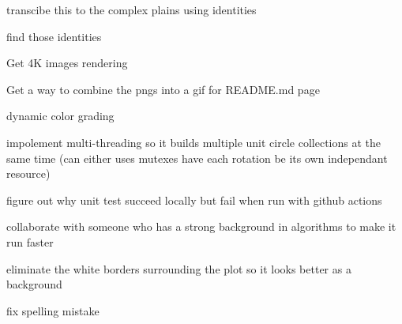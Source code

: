 
\begin{DoxyRefList}
\item[Class \mbox{\hyperlink{classEulersSpiral_1_1EulersSpiral}{Eulers\+Spiral.Eulers\+Spiral}} ]\label{todo__todo000001}%
%
transcibe this to the complex plains using identities 

find those identities  
\item[Namespace \mbox{\hyperlink{namespaceJulia}{Julia}} ]\label{todo__todo000002}%
%
Get 4K images rendering 

Get a way to combine the pngs into a gif for R\+E\+A\+D\+M\+E.\+md page 

dynamic color grading 

impolement multi-\/threading so it builds multiple unit circle collections at the same time (can either uses mutexes have each rotation be its own independant resource) 

figure out why unit test succeed locally but fail when run with github actions 

collaborate with someone who has a strong background in algorithms to make it run faster 

eliminate the white borders surrounding the plot so it looks better as a background  
\item[Member \mbox{\hyperlink{classJulia_1_1Julia_a966f5090e8ab789ab45b8bbe84435da9}{Julia.Julia.color\+\_\+map\+\_\+\+P\+IL}} (self, itterations\+\_\+til\+\_\+divergence)]\label{todo__todo000003}%
%
fix spelling mistake 
\end{DoxyRefList}